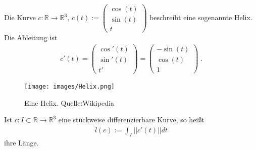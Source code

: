 \begin{Beispiel}
Die Kurve 
$c :  \mathbb{R}   \to  \mathbb{R}^3$, $c(t) :=  \begin{pmatrix} \cos(t) \\  \sin(t) \\  t \end{pmatrix}$
beschreibt eine sogenannte Helix. Die Ableitung ist
\begin{align*}
c'(t) =  \begin{pmatrix} \cos'(t) \\  \sin'(t) \\  t'  \end{pmatrix} = \begin{pmatrix} -\sin(t) \\  \cos(t) \\  1 \end{pmatrix} \;.
\end{align*} 
\end{Beispiel}
\begin{figure}[H]
    \centering
    \texttt{[image: images/Helix.png]}
    \caption{Eine Helix. Quelle:Wikipedia}
    \label{fig:helix}
\end{figure}

\begin{Definition}
Ist $c: I \subset \mathbb{R} \to \mathbb{R}^3$ eine stückweise differenzierbare Kurve, so heißt
\begin{align*}
l(c) := \int_{I} ||c'(t)|| dt
\end{align*}
ihre Länge.
\end{Definition}


